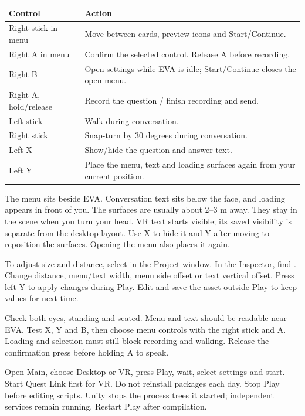 \begin{tabularx}{\linewidth}{@{}P{33mm}Y@{}}
\toprule
Control & Action\\
\midrule
Right stick in menu & Move between cards, preview icons and Start/Continue.\\
Right A in menu & Confirm the selected control. Release A before recording.\\
Right B & Open settings while EVA is idle; Start/Continue closes the open menu.\\
Right A, hold/release & Record the question / finish recording and send.\\
Left stick & Walk during conversation.\\
Right stick & Snap-turn by 30 degrees during conversation.\\
Left X & Show/hide the question and answer text.\\
Left Y & Place the menu, text and loading surfaces again from your current position.\\
\bottomrule
\end{tabularx}

The menu sits beside EVA. Conversation text sits below the face, and loading
appears in front of you. The surfaces are usually about 2--3 m away. They stay
in the scene when you turn your head. VR text starts visible; its saved visibility
is separate from the desktop layout. Use X to hide it and Y after moving to
reposition the surfaces. Opening the menu also places it again.

To adjust size and distance, select
 in the Project window.
In the Inspector, find . Change distance, menu/text
width, menu side offset or text vertical offset. Press left Y to apply changes
during Play. Edit and save the asset outside Play to keep values for next time.

Check both eyes, standing and seated. Menu and text should be readable near EVA.
Test X, Y and B, then choose menu controls with the right stick and A. Loading
and selection must still block recording and walking. Release the confirmation
press before holding A to speak.

Open Main, choose Desktop or VR, press Play, wait, select settings and start.
Start Quest Link first for VR. Do not reinstall packages each day. Stop Play
before editing scripts. Unity stops the process trees it started; independent
services remain running. Restart Play after compilation.

